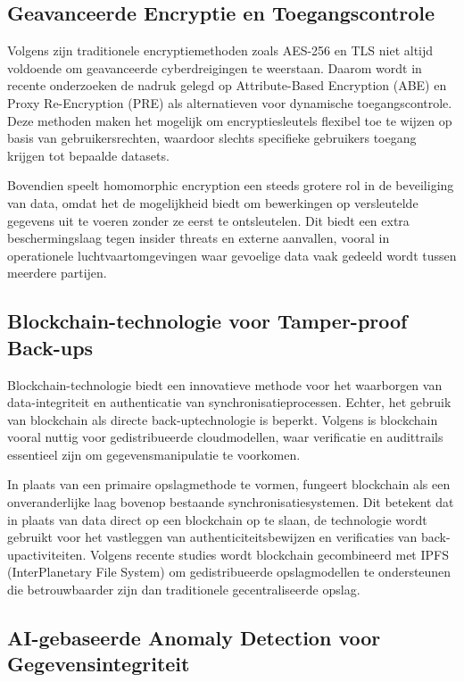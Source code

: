\subsection{Geavanceerde Encryptie en Toegangscontrole}
\label{subsec:encryptie}

Volgens \textcite{VinayakBhuvi} zijn traditionele encryptiemethoden zoals AES-256 en TLS niet altijd voldoende om geavanceerde cyberdreigingen te weerstaan. Daarom wordt in recente onderzoeken de nadruk gelegd op Attribute-Based Encryption (ABE) en Proxy Re-Encryption (PRE) als alternatieven voor dynamische toegangscontrole. Deze methoden maken het mogelijk om encryptiesleutels flexibel toe te wijzen op basis van gebruikersrechten, waardoor slechts specifieke gebruikers toegang krijgen tot bepaalde datasets.

Bovendien speelt homomorphic encryption een steeds grotere rol in de beveiliging van data, omdat het de mogelijkheid biedt om bewerkingen op versleutelde gegevens uit te voeren zonder ze eerst te ontsleutelen. Dit biedt een extra beschermingslaag tegen insider threats en externe aanvallen, vooral in operationele luchtvaartomgevingen waar gevoelige data vaak gedeeld wordt tussen meerdere partijen.

\subsection{Blockchain-technologie voor Tamper-proof Back-ups}
\label{subsec:blockchain}

Blockchain-technologie biedt een innovatieve methode voor het waarborgen van data-integriteit en authenticatie van synchronisatieprocessen. Echter, het gebruik van blockchain als directe back-uptechnologie is beperkt. Volgens \textcite{VinayakBhuvi} is blockchain vooral nuttig voor gedistribueerde cloudmodellen, waar verificatie en audittrails essentieel zijn om gegevensmanipulatie te voorkomen.

In plaats van een primaire opslagmethode te vormen, fungeert blockchain als een onveranderlijke laag bovenop bestaande synchronisatiesystemen. Dit betekent dat in plaats van data direct op een blockchain op te slaan, de technologie wordt gebruikt voor het vastleggen van authenticiteitsbewijzen en verificaties van back-upactiviteiten. Volgens recente studies wordt blockchain gecombineerd met IPFS (InterPlanetary File System) om gedistribueerde opslagmodellen te ondersteunen die betrouwbaarder zijn dan traditionele gecentraliseerde opslag.

\subsection{AI-gebaseerde Anomaly Detection voor Gegevensintegriteit}
\label{subsec:ai-anomaly-detection}

